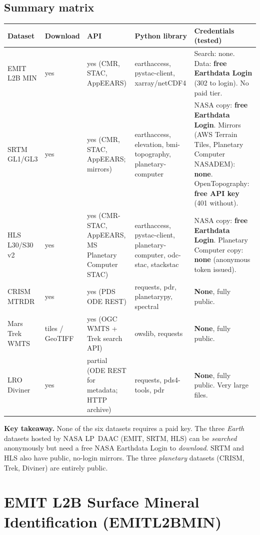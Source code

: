 \documentclass[10pt,a4paper]{article}
\begin{document}
\subsection*{Summary matrix}
{\small
{}
\begin{longtable}{@{}>{\raggedright\arraybackslash}p{2.9cm}>{\raggedright\arraybackslash}p{2.0cm}>{\raggedright\arraybackslash}p{2.3cm}>{\raggedright\arraybackslash}p{3.6cm}>{\raggedright\arraybackslash}p{5.4cm}@{}}
\toprule
\textbf{Dataset} & \textbf{Download} & \textbf{API} & \textbf{Python library} & \textbf{Credentials (tested)}\\\midrule\endhead
EMIT L2B MIN & yes & yes (CMR, STAC, AppEEARS) & earthaccess, pystac-client, xarray/netCDF4 & Search: none. Data: \textbf{free Earthdata Login} (302 to login). No paid tier.\\
SRTM GL1/GL3 & yes & yes (CMR, STAC, AppEEARS; mirrors) & earthaccess, elevation, bmi-topography, planetary-computer & NASA copy: \textbf{free Earthdata Login}. Mirrors (AWS Terrain Tiles, Planetary Computer NASADEM): \textbf{none}. OpenTopography: \textbf{free API key} (401 without).\\
HLS L30/S30 v2 & yes & yes (CMR-STAC, AppEEARS, MS Planetary Computer STAC) & earthaccess, pystac-client, planetary-computer, odc-stac, stackstac & NASA copy: \textbf{free Earthdata Login}. Planetary Computer copy: \textbf{none} (anonymous token issued).\\
CRISM MTRDR & yes & yes (PDS ODE REST) & requests, pdr, planetarypy, spectral & \textbf{None}, fully public.\\
Mars Trek WMTS & tiles / GeoTIFF & yes (OGC WMTS + Trek search API) & owslib, requests & \textbf{None}, fully public.\\
LRO Diviner & yes & partial (ODE REST for metadata; HTTP archive) & requests, pds4-tools, pdr & \textbf{None}, fully public. Very large files.\\
\bottomrule
\end{longtable}}

\textbf{Key takeaway.} None of the six datasets requires a paid key. The three \emph{Earth} datasets hosted by NASA LP~DAAC (EMIT, SRTM, HLS) can be \emph{searched} anonymously but need a free NASA Earthdata Login to \emph{download}. SRTM and HLS also have public, no-login mirrors. The three \emph{planetary} datasets (CRISM, Trek, Diviner) are entirely public.

\section{EMIT L2B Surface Mineral Identification (EMITL2BMIN)}
\end{document}
